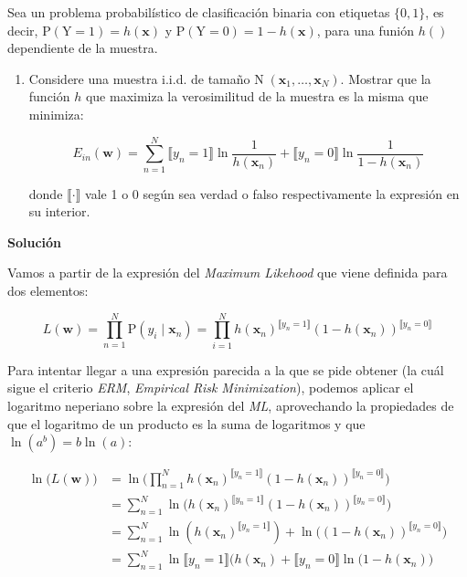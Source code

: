 \documentclass[11pt,a4paper]{article}
\newcommand{\answer}{\noindent\textbf{Solución}}
\begin{document}
\noindent Sea un problema probabilístico de clasificación binaria con etiquetas $\lbrace 0, 1\rbrace$, es decir,
$\text{P} (\text{Y} = 1) = h(\mathbf{x})$ y $\text{P} (\text{Y} = 0) = 1 - h(\mathbf{x})$, para una funión $h()$ dependiente
de la muestra.

\begin{enumerate}[label=\textit{\alph*})]
	\item Considere una muestra i.i.d. de tamaño $\text{N}\;(\mathbf{x}_1, \dots, \mathbf{x}_N)$. Mostrar que la función
	$h$ que maximiza la verosimilitud de la muestra es la misma que minimiza:
	
	\[E_{in}(\mathbf{w}) = \sum_{n=1}^N  \llbracket y_n = 1 \rrbracket \ln \frac{1}{h(\mathbf{x}_n)} +
	\llbracket y_n = 0 \rrbracket \ln \frac{1}{1 - h(\mathbf{x}_n)} \]
	
	donde $\llbracket \cdot \rrbracket$ vale 1 o 0 según sea verdad o falso respectivamente la expresión en su interior.
\end{enumerate}

\answer

Vamos a partir de la expresión del \textit{Maximum Likehood} que viene definida para dos elementos:

\begin{equation}
	L(\mathbf{w}) = \prod_{n=1}^N \text{P}(y_i \;| \;\mathbf{x}_n) = \prod_{i=1}^N
	h(\mathbf{x}_n)^{\llbracket y_n = 1 \rrbracket} (1 - h(\mathbf{x}_n))^{\llbracket y_n = 0 \rrbracket}
\end{equation}

Para intentar llegar a una expresión parecida a la que se pide obtener (la cuál sigue el criterio \textit{ERM},
\textit{Empirical Risk Minimization}), podemos aplicar el logaritmo neperiano sobre la expresión del \textit{ML},
aprovechando la propiedades de que el logaritmo de un producto es la suma de logaritmos y que $\ln(a^b) = b \ln(a)$:

\begin{equation}
\begin{split}
	\ln \Big( L(\mathbf{w}) \Big) &= \ln \Bigg( \prod_{n=1}^N
	h(\mathbf{x}_n)^{\llbracket y_n = 1 \rrbracket} (1 - h(\mathbf{x}_n))^{\llbracket y_n = 0 \rrbracket} \Bigg) \\
	&= \sum_{n=1}^N \ln \Big(
	h(\mathbf{x}_n)^{\llbracket y_n = 1 \rrbracket} (1 - h(\mathbf{x}_n))^{\llbracket y_n = 0 \rrbracket} \Big) \\
	&= \sum_{n=1}^N
	\ln (h(\mathbf{x}_n)^{\llbracket y_n = 1 \rrbracket}) + \ln \Big( (1 - h(\mathbf{x}_n))^{\llbracket y_n = 0 \rrbracket}
	\Big) \\
	&= \sum_{n=1}^N
	\ln \llbracket y_n = 1 \rrbracket (h(\mathbf{x}_n) + \llbracket y_n = 0 \rrbracket \ln \Big( 1 - h(\mathbf{x}_n) \Big)
\end{split}
\end{equation}
\end{document}
